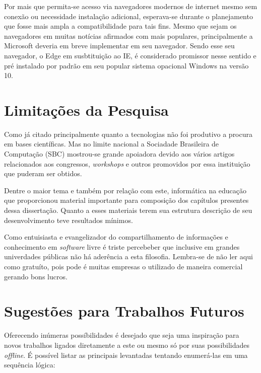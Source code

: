 Por mais que permita-se acesso via navegadores modernos de internet mesmo sem conexão ou necessidade instalação adicional, esperava-se durante o planejamento que fosse mais ampla a compatibilidade para tais fins. Mesmo que sejam os navegadores em muitas notícias afirmados com mais populares, principalmente a Microsoft deveria em breve implementar em seu navegador. Sendo esse seu navegador, o Edge em susbtituição ao IE, é considerado promissor nesse sentido e pré instalado por padrão em seu popular sistema opacional Windows na versão 10.

\section{Limitações da Pesquisa}

Como já citado principalmente quanto a tecnologias não foi produtivo a procura em bases científicas. Mas no limite nacional a Sociadade Brasileira de Computação (SBC) mostrou-se grande apoiadora devido aos vários artigos relacionados aos congressos, \textit{workshops} e outros promovidos por essa instituição que puderam ser obtidos.

Dentre o maior tema e também por relação com este, informática na educação que proporcionou material importante para composição dos capítulos presentes dessa dissertação. Quanto a esses materiais terem sua estrutura descrição de seu desenvolvimento teve resultados mínimos.

Como entuisiasta e evangelizador do compartilhamento de informações e conhecimento em \textit{software} livre é triste percebeber que inclusive em grandes univerdades públicas não há aderência a esta filosofia. Lembra-se de não ler aqui como gratuíto, pois pode é muitas empresas o utilizado de maneira comercial gerando bons lucros.

\section{Sugestões para Trabalhos Futuros}

Oferecendo inúmeras possíbilidades é desejado que seja uma inspiração para novos trabalhos ligados diretamente a este ou mesmo só por suas possibilidades \textit{offline}. É possível listar as principais levantadas tentando enumerá-las em uma sequência lógica:

